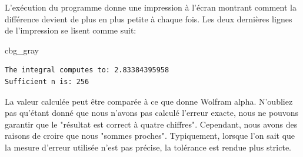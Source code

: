 \documentclass[%
oneside,                 %
final,                   %
10pt,french]{article}
\newenvironment{_cod_tight}[1]{
   \def\FrameCommand{\colorbox{#1}}
   \FrameRule0.6pt\MakeFramed {\FrameRestore}\vskip3mm}
   {\vskip0mm\endMakeFramed}
\newenvironment{cod}[1]{
\bgroup\rmfamily
\fboxsep=0mm\relax
\begin{_cod_tight}{#1}
\list{}{\parsep=-2mm\parskip=0mm\topsep=0pt\leftmargin=2mm
\rightmargin=2\leftmargin\leftmargin=4pt\relax}
\item\relax}
{\endlist\end{_cod_tight}\egroup}
\newenvironment{doconceexercise}{}{}
\begin{document}
\begin{doconceexercise}
L'exécution du programme donne une impression à l'écran montrant comment la différence devient de plus en plus petite à chaque fois. Les deux dernières lignes de l'impression se lisent comme suit:
\begin{cod}{cbg_gray}\begin{verbatim}
The integral computes to: 2.83384395958
Sufficient n is: 256
\end{verbatim}
\end{cod}
\noindent
La valeur calculée peut être comparée à ce que donne Wolfram alpha. N'oubliez pas qu'étant donné que nous n'avons pas calculé l'erreur exacte, nous ne pouvons garantir que le "résultat est correct à quatre chiffres". Cependant, nous avons des raisons de croire que nous "sommes proches". Typiquement, lorsque l'on sait que la mesure d'erreur utilisée n'est pas précise, la tolérance est rendue plus stricte.


\end{doconceexercise}


\end{document}
